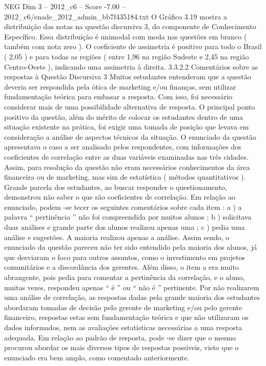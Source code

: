 \begin{textsample}{NEG Dim 3 – 2012\_c6 – Score -7.00 – 2012\_c6/enade\_2012\_admin\_bb7f435184.txt}
O Gráfico 3.19 mostra a distribuição das notas na questão discursiva 3, do componente de Conhecimento Específico.
Essa distribuição é unimodal com moda nas questões em branco ( também com nota zero ).
O coeficiente de assimetria é positivo para todo o Brasil ( 2,05 ) e para todas as regiões ( entre 1,96 na região Sudeste e 2,45 na região Centro-Oeste ), indicando uma assimetria à direita. 3.3.2.2 Comentários sobre as respostas à Questão Discursiva 3 Muitos estudantes entenderam que a questão deveria ser respondida pela ótica de marketing e/ou finanças, sem utilizar fundamentação teórica para embasar a resposta.
Com isso, foi necessário considerar mais de uma possibilidade alternativa de resposta.
O principal ponto positivo da questão, além do mérito de colocar os estudantes dentro de uma situação existente na prática, foi exigir uma tomada de posição que levava em consideração a análise de aspectos técnicos da situação.
O enunciado da questão apresentava o caso a ser analisado pelos respondentes, com informações dos coeficientes de correlação entre as duas variáveis examinadas nas três cidades.
Assim, para resolução da questão não eram necessários conhecimentos da área financeira ou de marketing, mas sim de estatística ( métodos quantitativos ).
Grande parcela dos estudantes, ao buscar responder o questionamento, demonstrou não saber o que são coeficientes de correlação.
Em relação ao enunciado, podem -se tecer os seguintes comentários sobre cada item : a ) a palavra “ pertinência ” não foi compreendida por muitos alunos ; b ) solicitava duas análises e grande parte dos alunos realizou apenas uma ; c ) pedia uma análise e sugestões.
A maioria realizou apenas a análise.
Assim sendo, o enunciado da questão pareceu não ter sido entendido pela maioria dos alunos, já que desviaram o foco para outros assuntos, como o investimento em projetos comunitários e a discordância dos gerentes.
Além disso, o item a era muito abrangente, pois pedia para comentar a pertinência da correlação, e o aluno, muitas vezes, respondeu apenas “ é ” ou “ não é ” pertinente.
Por não realizarem uma análise de correlação, as respostas dadas pela grande maioria dos estudantes abordaram tomadas de decisão pelo gerente de marketing e/ou pelo gerente financeiro, respostas estas sem fundamentação teórica e que não utilizaram os dados informados, nem as avaliações estatísticas necessárias a uma resposta adequada.
Em relação ao padrão de resposta, pode -se dizer que o mesmo procurou abordar os mais diversos tipos de respostas possíveis, visto que o enunciado era bem amplo, como comentado anteriormente.

\end{textsample}
